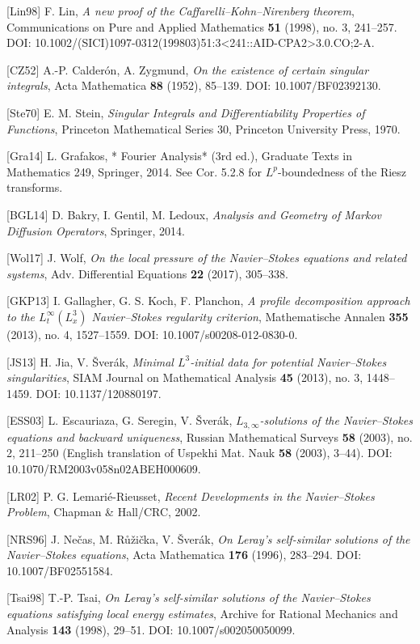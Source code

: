 \documentclass[
  11pt,
]{article}
\begin{document}
{[}Lin98{]} F. Lin, \emph{A new proof of the Caffarelli--Kohn--Nirenberg theorem}, Communications on Pure and Applied Mathematics \textbf{51} (1998), no. 3, 241--257. DOI: 10.1002/(SICI)1097-0312(199803)51:3\textless241::AID-CPA2\textgreater3.0.CO;2-A.

{[}CZ52{]} A.-P. Calderón, A. Zygmund, \emph{On the existence of certain singular integrals}, Acta Mathematica \textbf{88} (1952), 85--139. DOI: 10.1007/BF02392130.

{[}Ste70{]} E. M. Stein, \emph{Singular Integrals and Differentiability Properties of Functions}, Princeton Mathematical Series 30, Princeton University Press, 1970.

{[}Gra14{]} L. Grafakos, * Fourier Analysis* (3rd ed.), Graduate Texts in Mathematics 249, Springer, 2014. See Cor. 5.2.8 for \(L^p\)-boundedness of the Riesz transforms.

{[}BGL14{]} D. Bakry, I. Gentil, M. Ledoux, \emph{Analysis and Geometry of Markov Diffusion Operators}, Springer, 2014.

{[}Wol17{]} J. Wolf, \emph{On the local pressure of the Navier--Stokes equations and related systems}, Adv. Differential Equations \textbf{22} (2017), 305--338.

{[}GKP13{]} I. Gallagher, G. S. Koch, F. Planchon, \emph{A profile decomposition approach to the \(L^\infty_t(L^3_x)\) Navier--Stokes regularity criterion}, Mathematische Annalen \textbf{355} (2013), no. 4, 1527--1559. DOI: 10.1007/s00208-012-0830-0.

{[}JS13{]} H. Jia, V. Šverák, \emph{Minimal \(L^3\)-initial data for potential Navier--Stokes singularities}, SIAM Journal on Mathematical Analysis \textbf{45} (2013), no. 3, 1448--1459. DOI: 10.1137/120880197.

{[}ESS03{]} L. Escauriaza, G. Seregin, V. Šverák, \emph{\(L_{3,\infty}\)-solutions of the Navier--Stokes equations and backward uniqueness}, Russian Mathematical Surveys \textbf{58} (2003), no. 2, 211--250 (English translation of Uspekhi Mat. Nauk \textbf{58} (2003), 3--44). DOI: 10.1070/RM2003v058n02ABEH000609.

{[}LR02{]} P. G. Lemarié-Rieusset, \emph{Recent Developments in the Navier--Stokes Problem}, Chapman \& Hall/CRC, 2002.

{[}NRS96{]} J. Nečas, M. Růžička, V. Šverák, \emph{On Leray's self-similar solutions of the Navier--Stokes equations}, Acta Mathematica \textbf{176} (1996), 283--294. DOI: 10.1007/BF02551584.

{[}Tsai98{]} T.-P. Tsai, \emph{On Leray's self-similar solutions of the Navier--Stokes equations satisfying local energy estimates}, Archive for Rational Mechanics and Analysis \textbf{143} (1998), 29--51. DOI: 10.1007/s002050050099.
\end{document}
